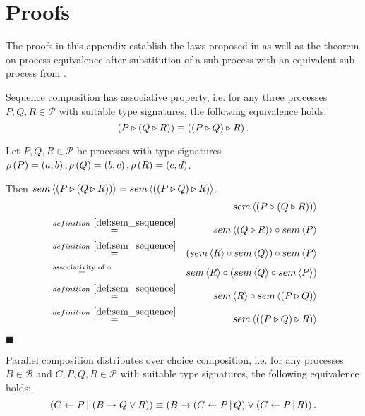 \chapter{Proofs}
\label{chp:proofs}
The proofs in this appendix establish the laws proposed in  as well as the theorem on process equivalence after substitution of a sub-process with an equivalent sub-process from .

\vfill
\begin{theorem}
\label{thm:associativity_sequence}
Sequence composition has associative property, i.e. for any three processes $P, Q, R \in \mathcal{P}$ with suitable type signatures, the following equivalence holds:
\begin{equation*}
  \left( P \triangleright \left( Q \triangleright R \right) \right) \equiv \left( \left( P \triangleright Q \right) \triangleright R \right).
\end{equation*}
\end{theorem}

\begin{myproof}
Let $P, Q, R \in \mathcal{P}$ be processes with type signatures $\rho \left( P \right) = \left( a, b \right), \rho \left( Q \right) = \left( b, c \right), \rho \left( R \right) = \left( c, d \right)$.

Then $sem \left\langle \left( P \triangleright \left( Q \triangleright R \right) \right) \right\rangle = sem \left\langle \left( \left( P \triangleright Q \right) \triangleright R \right) \right\rangle$.
\begin{eqnarray*}
  & & \sem{\sequence{P}{\sequence{Q}{R}}} \\
  & \overset{\defref{def:sem_sequence}}{=} & \sem{\sequence{Q}{R}} \circ \sem{P} \\
  & \overset{\defref{def:sem_sequence}}{=} & \left( \sem{R} \circ \sem{Q} \right) \circ \sem{P} \\
  & \overset{\text{associativity of }\circ}{=} & \sem{R} \circ \left( \sem{Q} \circ \sem{P} \right) \\
  & \overset{\defref{def:sem_sequence}}{=} & \sem{R} \circ \sem{\sequence{P}{Q}} \\
  & \overset{\defref{def:sem_sequence}}{=} & \sem{\sequence{\sequence{P}{Q}}{R}}
\end{eqnarray*}

\hfill$\blacksquare$
\end{myproof}


\clearpage
\begin{theorem}
\label{thm:distributivity_parallel_choice}
Parallel composition distributes over choice composition, i.e. for any processes $B \in \mathcal{B}$ and $C, P, Q, R \in \mathcal{P}$ with suitable type signatures, the following equivalence holds:
\begin{equation*}
  \left( C \gets P \, | \, \left( B \to Q \vee R \right) \right) \equiv \left( B \to \left( C \gets P \, | \, Q \right) \vee \left( C \gets P \, | \, R \right) \right).
\end{equation*}
\end{theorem}

